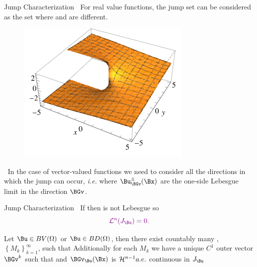 \documentclass{beamer}
\newcommand{\bul}{{\color{structure}\textbullet}}
\begin{document}
\begin{frame}{Jump Characterization}
    \bul$\ $  For real value functions, the jump set can be considered as the set where  and  are different.
    \begin{figure}
        \includegraphics[scale=0.6]{figures/2dJump.png}
    \end{figure}
    \pause
    \bul$\ $ In the case of vector-valued functions we need to consider all the directions in which the jump can occur, \textit{i.e.}
    where $\Bu_{\BGv}^\pm(\Bx)$ are the one-side Lebesgue limit in the direction $\BGv$. 
\end{frame}
\begin{frame}{Jump Characterization}
    \bul $\ $ If  then \vl{$\Bx$} is not Lebesgue so $$\vl{$ \CL^n(J_\Bu)=0.$}$$
    \pause\vfill
    \begin{theorem}[\vl{$\CH^{n-1}$} a.e. rectifiable] Let $\Bu\in BV(\Omega)$ or $\Bu\in BD(\Omega)$, then there exist countably many , $\left\{M_k\right\}_{k=1}^{\infty}$, such that
        Additionally for each $M_k$ we have a unique $C^1$ outer vector $\BGv^k$ such that
        and  $\BGv_\Bu(\Bx)$ is  ${\mathcal H}^{n-1} a.e.$ continuous  in $J_\Bu$ 
    \end{theorem}  
\end{frame}
\end{document}
